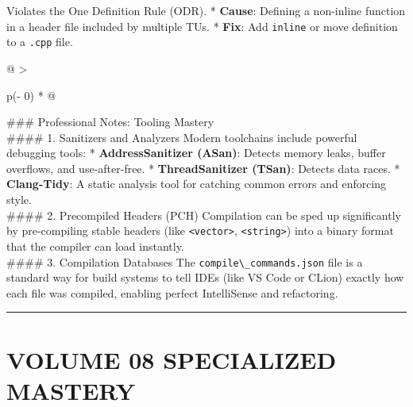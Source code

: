 Violates the One Definition Rule (ODR). * \textbf{Cause}: Defining a
non-inline function in a header file included by multiple TUs. *
\textbf{Fix}: Add \passthrough{\lstinline!inline!} or move definition to
a \passthrough{\lstinline!.cpp!} file.

\begin{longtable}[]{@{}
  >{\raggedright\arraybackslash}p{(\columnwidth - 0\tabcolsep) * }@{}}
\toprule
\endhead
\#\#\# Professional Notes: Tooling Mastery \\
\#\#\#\# 1. Sanitizers and Analyzers Modern toolchains include powerful
debugging tools: * \textbf{AddressSanitizer (ASan)}: Detects memory
leaks, buffer overflows, and use-after-free. * \textbf{ThreadSanitizer
(TSan)}: Detects data races. * \textbf{Clang-Tidy}: A static analysis
tool for catching common errors and enforcing style. \\
\#\#\#\# 2. Precompiled Headers (PCH) Compilation can be sped up
significantly by pre-compiling stable headers (like
\passthrough{\lstinline!<vector>!}, \passthrough{\lstinline!<string>!})
into a binary format that the compiler can load instantly. \\
\#\#\#\# 3. Compilation Databases The
\passthrough{\lstinline!compile\_commands.json!} file is a standard way
for build systems to tell IDEs (like VS Code or CLion) exactly how each
file was compiled, enabling perfect IntelliSense and refactoring. \\
\bottomrule
\end{longtable}

\begin{center}\rule{0.5\linewidth}{0.5pt}\end{center}

\hypertarget{volume-08-specialized-mastery}{%
\chapter{VOLUME 08 SPECIALIZED
MASTERY}\label{volume-08-specialized-mastery}}
